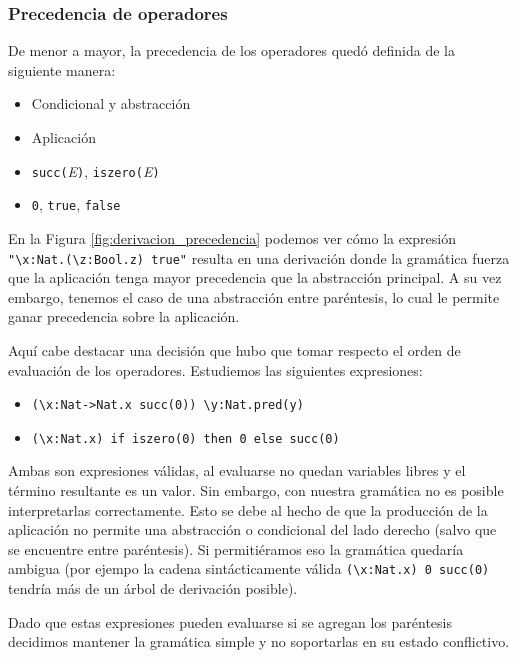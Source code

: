 \documentclass[11pt]{article}
\begin{document}
\subsubsection{Precedencia de operadores}

De menor a mayor, la precedencia de los operadores quedó definida de la
siguiente manera:

\begin{itemize}
  \item Condicional y abstracción
  \item Aplicación
  \item \verb|succ(|\emph{E}\verb|)|, \verb|iszero(|\emph{E}\verb|)|
  \item \verb|0|, \verb|true|, \verb|false|
\end{itemize}

En la Figura \ref{fig:derivacion_precedencia} podemos ver cómo la
expresión \verb|"\x:Nat.(\z:Bool.z) true"| resulta en una derivación donde
la gramática fuerza que la aplicación tenga mayor precedencia que la
abstracción principal. A su vez embargo, tenemos el caso de una abstracción 
entre paréntesis, lo cual le permite ganar precedencia sobre la aplicación.

Aquí cabe destacar una decisión que hubo que tomar respecto el orden de
evaluación de los operadores. Estudiemos las siguientes expresiones:

\begin{itemize}
	\item \verb|(\x:Nat->Nat.x succ(0)) \y:Nat.pred(y)|
	\item \verb|(\x:Nat.x) if iszero(0) then 0 else succ(0)|
\end{itemize}

Ambas son expresiones válidas, al evaluarse no quedan variables libres y
el término resultante es un valor. Sin embargo, con nuestra gramática no
es posible interpretarlas correctamente. Esto se debe al hecho de que la
producción de la aplicación no permite una abstracción o condicional del
lado derecho (salvo que se encuentre entre paréntesis). Si permitiéramos 
eso la gramática quedaría ambigua (por ejempo la cadena sintácticamente
válida \verb|(\x:Nat.x) 0 succ(0)| tendría más de un árbol de
derivación posible).

Dado que estas expresiones pueden evaluarse si se agregan los paréntesis
decidimos mantener la gramática simple y no soportarlas en su estado
conflictivo.
\end{document}
